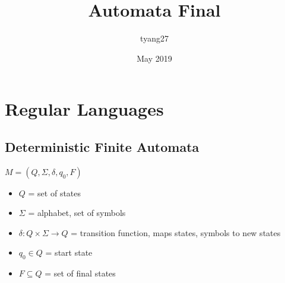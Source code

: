 \documentclass{article}
\title{Automata Final}
\author{tyang27}
\date{May 2019}
\begin{document}
\maketitle

\section{Regular Languages}

\subsection{Deterministic Finite Automata}
$M = (Q, \Sigma, \delta, q_0, F)$
\begin{itemize}
    \item $Q$ = set of states
    \item $\Sigma$ = alphabet, set of symbols
    \item $\delta : Q \times \Sigma \rightarrow Q$ = transition function, maps states, symbols to new states
    \item $q_0 \in Q$ = start state
    \item $F \subseteq Q$ = set of final states
\end{itemize}
\end{document}
